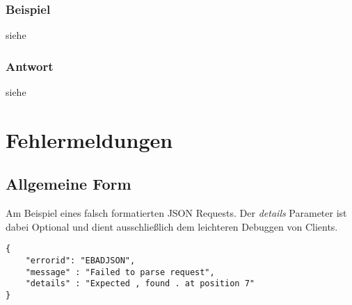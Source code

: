 \documentclass[ngerman,titlepage,parskip=true]{scrartcl}
\begin{document}
\subsubsection{Beispiel}
	siehe 
    
    \subsubsection{Antwort}	
	siehe 
	
		
\section{Fehlermeldungen}
\subsection{Allgemeine Form}
Am Beispiel eines falsch formatierten JSON Requests.
Der \textit{details} Parameter ist dabei Optional und dient ausschließlich dem leichteren Debuggen von 
Clients.
	\begin{lstlisting}
{
	"errorid": "EBADJSON",
	"message" : "Failed to parse request",
	"details" : "Expected , found . at position 7"
}
	\end{lstlisting}
\end{document}
